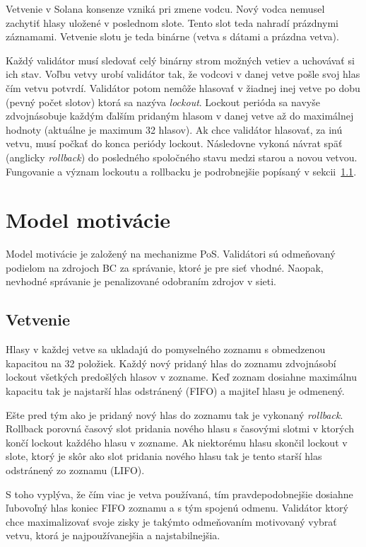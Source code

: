 Vetvenie v Solana konsenze vzniká pri zmene vodcu. Nový vodca nemusel zachytiť hlasy uložené v poslednom slote. Tento slot teda nahradí prázdnymi záznamami. Vetvenie slotu je teda binárne (vetva s dátami a prázdna vetva). 

Každý validátor musí sledovať celý binárny strom možných vetiev a uchovávať si ich stav. Voľbu vetvy urobí validátor tak, že vodcovi v danej vetve pošle svoj hlas čím vetvu potvrdí. Validátor potom nemôže hlasovať v žiadnej inej vetve po dobu (pevný počet slotov) ktorá sa nazýva \textit{lockout}. Lockout perióda sa navyše zdvojnásobuje každým ďalším pridaným hlasom v danej vetve až do maximálnej hodnoty (aktuálne je maximum 32 hlasov). Ak chce validátor hlasovať, za inú vetvu, musí počkať do konca periódy lockout. Následovne vykoná návrat späť (anglicky \textit{rollback}) do posledného spoločného stavu medzi starou a novou vetvou. Fungovanie a význam lockoutu a rollbacku je podrobnejšie popísaný v sekcii~\ref{subsec:solana-branch}.

\section{Model motivácie}\label{sec:solana-motiv}
Model motivácie je založený na mechanizme PoS. Validátori sú odmeňovaný podielom na zdrojoch BC za správanie, ktoré je pre sieť vhodné. Naopak, nevhodné správanie je penalizované odobraním zdrojov v sieti.

\subsection{Vetvenie}\label{subsec:solana-branch}
Hlasy v každej vetve sa ukladajú do pomyselného zoznamu s obmedzenou kapacitou na 32 položiek. Každý nový pridaný hlas do zoznamu zdvojnásobí lockout všetkých predošlých hlasov v zozname. Keď zoznam dosiahne maximálnu kapacitu tak je najstarší hlas odstránený (FIFO) a majiteľ hlasu je odmenený.

Ešte pred tým ako je pridaný nový hlas do zoznamu tak je vykonaný \textit{rollback}. Rollback porovná časový slot pridania nového hlasu s časovými slotmi v ktorých končí lockout každého hlasu v zozname. Ak niektorému hlasu skončil lockout v slote, ktorý je skôr ako slot pridania nového hlasu tak je tento starší hlas odstránený zo zoznamu (LIFO).

S toho vyplýva, že čím viac je vetva používaná, tím pravdepodobnejšie dosiahne ľubovoľný hlas koniec FIFO zoznamu a s tým spojenú odmenu. Validátor ktorý chce maximalizovať svoje zisky je takýmto odmeňovaním motivovaný vybrať vetvu, ktorá je najpoužívanejšia a najstabilnejšia.

